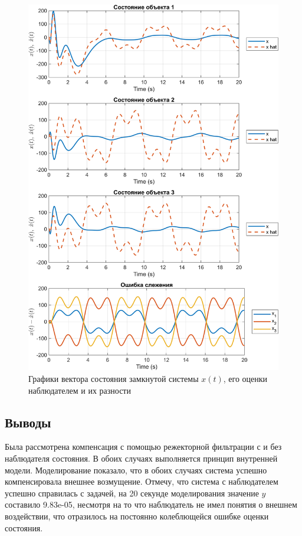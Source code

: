 \begin{figure}[H]
    \centering
    \includegraphics[width=\linewidth]{figs/2_1_1_sim.png}
    \caption{Графики вектора состояния замкнутой системы $x(t)$, его оценки наблюдателем и 
    их разности}
    \label{fig:2_1_1_sim}
\end{figure}


\subsection{Выводы}

Была рассмотрена компенсация с помощью режекторной фильтрации с и без наблюдателя состояния.
В обоих случаях выполняется принцип внутренней модели. Моделирование показало,
что в обоих случаях система успешно компенсировала внешнее возмущение. Отмечу, что система с наблюдателем
успешно справилась с задачей, на 20 секунде моделирования значение $y$ составило 9.83e-05, несмотря на то что
наблюдатель не имел понятия о внешнем воздействии, что отразилось на постоянно колеблющейся ошибке
оценки состояния.




